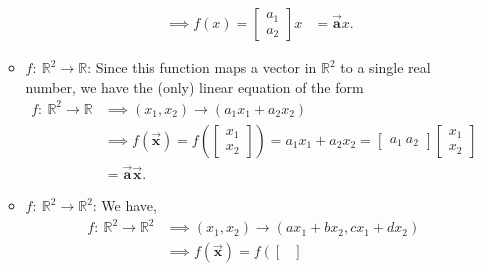 \documentclass{report}
\begin{document}
\begin{itemize}
\begin{itemize}
\begin{align*}
                                                              &\implies f(x) = 
                                                              \begin{bmatrix}
                                                                  a_{1} \\ a_{2}
                                                              \end{bmatrix} x 
                                                              &=\vec{\mathbf{a}}x
                          .\end{align*}
                      \item $f:\ \mathbb{R}^{2} \to \mathbb{R}$: Since this function maps a vector in $\mathbb{R}^{2}$ to a single real number, we have the (only) linear equation of the form
                          \begin{align*}
                              f:\ \mathbb{R}^{2} \to \mathbb{R} &\implies (x_{1}, x_{2}) \to (a_{1}x_{1} + a_{2}x_{2}) \\
                                                                &\implies f(\vec{\mathbf{x}}) = f\left( \begin{bmatrix}
                                      x_{1} \\ x_{2}
                                  \end{bmatrix}\right) = a_{1}x_{1} + a_{2}x_{2} = \begin{bmatrix}
                                  a_{1}\ a_{2}
                              \end{bmatrix}
                              \begin{bmatrix}
                                  x_{1} \\ x_{2}
                              \end{bmatrix} \\
                                                                &=\vec{\mathbf{a}}\vec{\mathbf{x}}
                          .\end{align*}
                      \item $f:\ \mathbb{R}^{2} \to \mathbb{R}^{2}$: We have,
                          \begin{align*}
                              f:\ \mathbb{R}^{2} \to \mathbb{R}^{2} &\implies (x_{1}, x_{2}) \to (ax_{1}+ bx_{2}, cx_{1} + dx_{2}) \\
                                                                    &\implies f(\vec{\mathbf{x}}) = f\left( \begin{bmatrix}

\end{bmatrix}
\end{align*}
\end{itemize}
\end{itemize}
\end{document}
